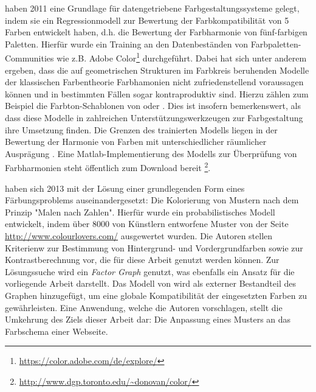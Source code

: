 \documentclass[11pt,a4paper,bibliography=totoc,twocolumn]{scrartcl}
\begin{document}
\citet{colorcomp} haben 2011 eine Grundlage für datengetriebene Farbgestaltungssysteme gelegt, indem sie ein Regressionmodell zur Bewertung der Farbkompatibilität von 5 Farben entwickelt haben, d.h. die Bewertung der Farbharmonie von fünf-farbigen Paletten. Hierfür wurde ein Training an den Datenbeständen von Farbpaletten-Communities wie z.B. Adobe Color\footnote{\url{https://color.adobe.com/de/explore/}} durchgeführt. Dabei hat sich unter anderem ergeben, dass die auf geometrischen Strukturen im Farbkreis beruhenden Modelle der klassischen Farbentheorie Farbhamonien nicht zufriedenstellend voraussagen können und in bestimmten Fällen sogar kontraproduktiv sind. Hierzu zählen zum Beispiel die Farbton-Schablonen von \citet{itten} oder \citet{munsell}. Dies ist insofern bemerkenswert, als dass diese Modelle in zahlreichen Unterstützungswerkzeugen zur Farbgestaltung ihre Umsetzung finden. Die Grenzen des trainierten Modells liegen in der Bewertung der Harmonie von Farben mit unterschiedlicher räumlicher Ausprägung \citep{webpage, patterns}. Eine Matlab-Implementierung des Modells zur Überprüfung von Farbharmonien steht öffentlich zum Download bereit \footnote{\url{http://www.dgp.toronto.edu/~donovan/color/}}.

\citet{patterns} haben sich 2013 mit der Lösung einer grundlegenden Form eines Färbungsproblems auseinandergesetzt: Die Kolorierung von Mustern nach dem Prinzip "Malen nach Zahlen". Hierfür wurde ein probabilistisches Modell entwickelt, indem über 8000 von Künstlern entworfene Muster von der Seite \url{http://www.colourlovers.com/} ausgewertet wurden. Die Autoren stellen Kriterienw zur Bestimmung von Hintergrund- und Vordergrundfarben sowie zur Kontrastberechnung vor, die für diese Arbeit genutzt werden können. Zur Lösungssuche wird ein \emph{Factor Graph} genutzt, was ebenfalls ein Ansatz für die vorliegende Arbeit darstellt. Das Modell von \citet{colorcomp} wird als externer Bestandteil des Graphen hinzugefügt, um eine globale Kompatibilität der eingesetzten Farben zu gewährleisten. Eine Anwendung, welche die Autoren vorschlagen, stellt die Umkehrung des Ziels dieser Arbeit dar: Die Anpassung eines Musters an das Farbschema einer Webseite.
\end{document}

